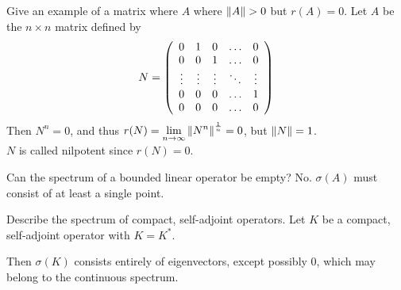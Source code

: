 \documentclass[avery5388,grid,frame]{flashcards}
\newcommand{\f}[3]{#1\ :\ #2 \rightarrow #3}
\begin{document}
\begin{flashcard}
    {Give an example of a matrix where $A$ where $\norm{A} > 0$ but $r(A) = 0$.}
    Let $A$ be the $n \times n$ matrix defined by
    \begin{equation*}
        N = \qty(\begin{array}{ccccc}
            0 & 1 & 0 & \dots & 0 \\
            0 & 0 & 1 & \dots & 0 \\
            \vdots & \vdots & \vdots & \ddots & \vdots \\
            0 & 0 & 0 & \dots & 1 \\
            0 & 0 & 0 & \dots & 0
        \end{array})
    \end{equation*}
    Then $N^n = 0$, and thus $r(N) = \displaystyle\lim_{n\rightarrow \infty}\norm{N^n}^{\frac{1}{n}} = 0$, but $\norm{N} = 1$. \\

    $N$ is called nilpotent since $r(N) = 0$.
\end{flashcard}

\begin{flashcard}
    {Can the spectrum of a bounded linear operator be empty?}
    No.  $\sigma(A)$ must consist of at least a single point.
\end{flashcard}


\begin{flashcard}
    {Describe the spectrum of compact, self-adjoint operators.}
    Let $K$ be a compact, self-adjoint operator with $K = K^*$.

    Then $\sigma(K)$ consists entirely of eigenvectors, except possibly $0$, which may belong to the continuous spectrum.
\end{flashcard}
\end{document}
